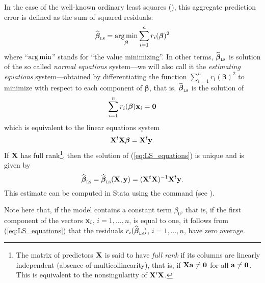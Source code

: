 In the case of the well-known ordinary least squares (), this
aggregate prediction error is defined as the sum of squared residuals:
%
\begin{equation}\label{eq:LS_min}
    \sthat{\boldsymbol\beta}_\stsc{LS} = \argmin_{\boldsymbol\beta} 
    \sum_{i=1}^{n} r_i(\boldsymbol\beta)^2
\end{equation}
%
where “$\mathop{\arg\min}$” stands for “the value minimizing”. In other terms,
$\sthat{\boldsymbol\beta}_\stsc{LS}$ is solution of the so called
\emph{normal equations} system---we will also call it the \emph{estimating
equations} system---obtained by differentiating the function $\sum_{i=1}^{n}
r_i(\boldsymbol\beta)^2$ to minimize with respect to each component of
$\boldsymbol\beta$, that is, $\sthat{\boldsymbol\beta}_\stsc{LS}$ is the
solution of
%
\begin{equation}\label{eq:LS_equations}
    \sum_{i=1}^{n}  r_i(\boldsymbol\beta)\mathbf x_i = \mathbf 0
\end{equation}
%
which is equivalent to the linear equations system
\[
    \mathbf X^t\mathbf X\boldsymbol\beta = \mathbf X^t\mathbf y.
\]
If $\mathbf X$ has full rank\footnote{The matrix of predictors $\mathbf X$ is
said to have \emph{full rank} if its columns are linearly independent (absence
of multicollinearity), that is, if $\mathbf X\mathbf a\neq\mathbf 0$ for all
$\mathbf a\neq\mathbf 0$. This is equivalent to the nonsingularity of
$\mathbf X'\mathbf X$.}, then the solution of (\ref{eq:LS_equations}) is unique
and is given by
%
\begin{equation}\label{eq:LS_estimator}
    \sthat{\boldsymbol\beta}_\stsc{LS}
    = \sthat{\boldsymbol\beta}_\stsc{LS}(\stmat{X}, \stvec{y})
    = (\stmat{X}^t\stmat{X})^{-1} \stmat{X}^t\stvec{y}.
\end{equation}
%
This estimate can be computed in Stata using the  command (see
).

Note here that, if the model contains a constant term $\beta_0$, that is, if
the first component of the vectors $\mathbf x_i$, $i = 1, \dots, n$, is equal
to one, it follows from (\ref{eq:LS_equations}) that the residuals
$r_i(\sthat{\boldsymbol\beta}_\stsc{LS})$, $i = 1, \dots, n$, have zero
average.

